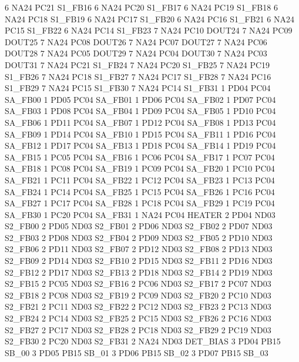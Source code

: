 6   NA24    PC21    S1_FB16
6   NA24    PC20    S1_FB17
6   NA24    PC19    S1_FB18
6   NA24    PC18    S1_FB19
6   NA24    PC17    S1_FB20
6   NA24    PC16    S1_FB21
6   NA24    PC15    S1_FB22
6   NA24    PC14    S1_FB23
7   NA24    PC10    DOUT24
7   NA24    PC09    DOUT25
7   NA24    PC08    DOUT26
7   NA24    PC07    DOUT27
7   NA24    PC06    DOUT28
7   NA24    PC05    DOUT29
7   NA24    PC04    DOUT30
7   NA24    PC03    DOUT31
7   NA24    PC21    S1_FB24
7   NA24    PC20    S1_FB25
7   NA24    PC19    S1_FB26
7   NA24    PC18    S1_FB27
7   NA24    PC17    S1_FB28
7   NA24    PC16    S1_FB29
7   NA24    PC15    S1_FB30
7   NA24    PC14    S1_FB31
1   PD04    PC04    SA_FB00
1   PD05    PC04    SA_FB01
1   PD06    PC04    SA_FB02
1   PD07    PC04    SA_FB03
1   PD08    PC04    SA_FB04
1   PD09    PC04    SA_FB05
1   PD10    PC04    SA_FB06
1   PD11    PC04    SA_FB07
1   PD12    PC04    SA_FB08
1   PD13    PC04    SA_FB09
1   PD14    PC04    SA_FB10
1   PD15    PC04    SA_FB11
1   PD16    PC04    SA_FB12
1   PD17    PC04    SA_FB13
1   PD18    PC04    SA_FB14
1   PD19    PC04    SA_FB15
1   PC05    PC04    SA_FB16
1   PC06    PC04    SA_FB17
1   PC07    PC04    SA_FB18
1   PC08    PC04    SA_FB19
1   PC09    PC04    SA_FB20
1   PC10    PC04    SA_FB21
1   PC11    PC04    SA_FB22
1   PC12    PC04    SA_FB23
1   PC13    PC04    SA_FB24
1   PC14    PC04    SA_FB25
1   PC15    PC04    SA_FB26
1   PC16    PC04    SA_FB27
1   PC17    PC04    SA_FB28
1   PC18    PC04    SA_FB29
1   PC19    PC04    SA_FB30
1   PC20    PC04    SA_FB31
1   NA24    PC04    HEATER
2   PD04    ND03    S2_FB00
2   PD05    ND03    S2_FB01
2   PD06    ND03    S2_FB02
2   PD07    ND03    S2_FB03
2   PD08    ND03    S2_FB04
2   PD09    ND03    S2_FB05
2   PD10    ND03    S2_FB06
2   PD11    ND03    S2_FB07
2   PD12    ND03    S2_FB08
2   PD13    ND03    S2_FB09
2   PD14    ND03    S2_FB10
2   PD15    ND03    S2_FB11
2   PD16    ND03    S2_FB12
2   PD17    ND03    S2_FB13
2   PD18    ND03    S2_FB14
2   PD19    ND03    S2_FB15
2   PC05    ND03    S2_FB16
2   PC06    ND03    S2_FB17
2   PC07    ND03    S2_FB18
2   PC08    ND03    S2_FB19
2   PC09    ND03    S2_FB20
2   PC10    ND03    S2_FB21
2   PC11    ND03    S2_FB22
2   PC12    ND03    S2_FB23
2   PC13    ND03    S2_FB24
2   PC14    ND03    S2_FB25
2   PC15    ND03    S2_FB26
2   PC16    ND03    S2_FB27
2   PC17    ND03    S2_FB28
2   PC18    ND03    S2_FB29
2   PC19    ND03    S2_FB30
2   PC20    ND03    S2_FB31
2   NA24    ND03    DET_BIAS
3   PD04    PB15    SB_00
3   PD05    PB15    SB_01
3   PD06    PB15    SB_02
3   PD07    PB15    SB_03
